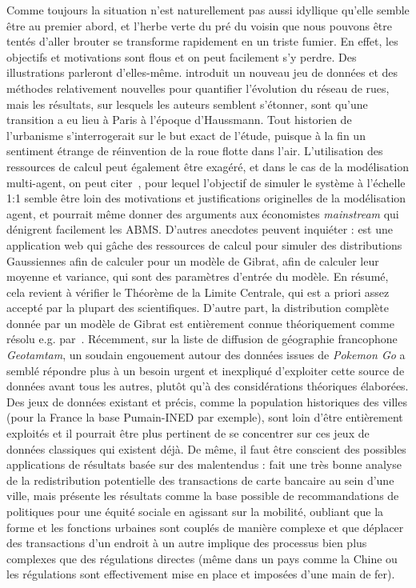{}{
Comme toujours la situation n'est naturellement pas aussi idyllique qu'elle semble être au premier abord, et l'herbe verte du pré du voisin que nous pouvons être tentés d'aller brouter se transforme rapidement en un triste fumier. En effet, les objectifs et motivations sont flous et on peut facilement s'y perdre. Des illustrations parleront d'elles-même. \cite{barthelemy2013self} introduit un nouveau jeu de données et des méthodes relativement nouvelles pour quantifier l'évolution du réseau de rues, mais les résultats, sur lesquels les auteurs semblent s'étonner, sont qu'une transition a eu lieu à Paris à l'époque d'Haussmann. Tout historien de l'urbanisme s'interrogerait sur le but exact de l'étude, puisque à la fin un sentiment étrange de réinvention de la roue flotte dans l'air. L'utilisation des ressources de calcul peut également être exagéré, et dans le cas de la modélisation multi-agent, on peut citer~\cite{axtell2016120}, pour lequel l'objectif de simuler le système à l'échelle 1:1 semble être loin des motivations et justifications originelles de la modélisation agent, et pourrait même donner des arguments aux économistes \emph{mainstream} qui dénigrent facilement les ABMS. D'autres anecdotes peuvent inquiéter : \cite{robin_cura_2014_11415} est une application web qui gâche des ressources de calcul  pour simuler des distributions Gaussiennes afin de calculer pour un modèle de Gibrat, afin de calculer leur moyenne et variance, qui sont des paramètres d'entrée du modèle. En résumé, cela revient à vérifier le Théorème de la Limite Centrale, qui est a priori assez accepté par la plupart des scientifiques. D'autre part, la distribution complète donnée par un modèle de Gibrat est entièrement connue théoriquement comme résolu e.g. par~\cite{gabaix1999zipf}. Récemment, sur la liste de diffusion de géographie francophone \emph{Geotamtam}, un soudain engouement autour des données issues de \emph{Pokemon Go} a semblé répondre plus à un besoin urgent et inexpliqué d'exploiter cette source de données avant tous les autres, plutôt qu'à des considérations théoriques élaborées. Des jeux de données existant et précis, comme la population historiques des villes (pour la France la base Pumain-INED par exemple), sont loin d'être entièrement exploités et il pourrait être plus pertinent de se concentrer sur ces jeux de données classiques qui existent déjà. De même, il faut être conscient des possibles applications de résultats basée sur des malentendus : \cite{louail2016crowdsourcing} fait une très bonne analyse de la redistribution potentielle des transactions de carte bancaire au sein d'une ville, mais présente les résultats comme la base possible de recommandations de politiques pour une équité sociale en agissant sur la mobilité, oubliant que la forme et les fonctions urbaines sont couplés de manière complexe et que déplacer des transactions d'un endroit à un autre implique des processus bien plus complexes que des régulations directes (même dans un pays comme la Chine ou les régulations sont effectivement mise en place et imposées d'une main de fer).
}




